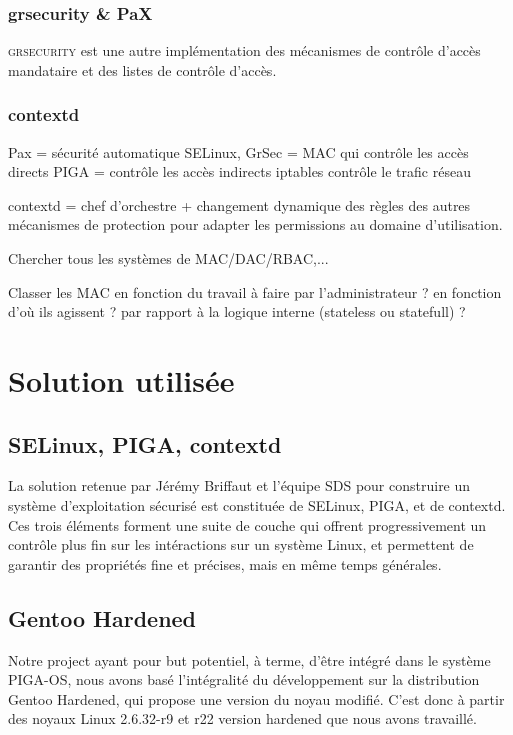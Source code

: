 \subsubsection{grsecurity \& PaX}

\textsc{grsecurity} est une autre implémentation des mécanismes de contrôle d'accès mandataire et des listes de contrôle d'accès. %

\subsubsection{contextd}

Pax = sécurité automatique
SELinux, GrSec = MAC qui contrôle les accès directs
PIGA = contrôle les accès indirects
iptables contrôle le trafic réseau

contextd = chef d'orchestre + changement dynamique des règles des autres  mécanismes de protection pour adapter les permissions au domaine d'utilisation.

Chercher tous les systèmes de MAC/DAC/RBAC,...

Classer les MAC en fonction du travail à faire par l'administrateur ? en fonction d'où ils agissent ? par rapport à la logique interne (stateless ou statefull) ?

\newpage

\section{Solution utilisée}


\subsection{SELinux, PIGA, contextd}

La solution retenue par Jérémy Briffaut et l'équipe SDS pour construire un système d'exploitation sécurisé est constituée de SELinux, PIGA, et de contextd. Ces trois éléments forment une suite de couche qui offrent progressivement un contrôle plus fin sur les intéractions sur un système Linux, et permettent de garantir des propriétés fine et précises, mais en même temps générales.

\subsection{Gentoo Hardened}

Notre project ayant pour but potentiel, à terme, d'être intégré dans le système PIGA-OS, nous avons basé l'intégralité du développement sur la distribution Gentoo Hardened, qui propose une version du noyau modifié. C'est donc à partir des noyaux Linux 2.6.32-r9 et r22 version hardened que nous avons travaillé.
